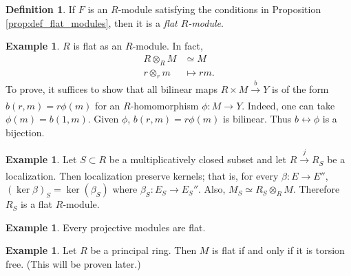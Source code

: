 \documentclass[12pt]{report}
\theoremstyle{plain}
\theoremstyle{remark}
\theoremstyle{definition}
\newtheorem{definition}[theorem]{Definition}
\newtheorem{example}[theorem]{Example}
\begin{document}
\begin{definition}
    If $F$ is an $R$-module satisfying the conditions in Proposition \ref{prop:def_flat_modules}, then it is a \emph{flat $R$-module}.
\end{definition}

\begin{example}
    $R$ is flat as an $R$-module. In fact, 
    \begin{align*}
        R\otimes_R M&\simeq M \\
        r\otimes_r m&\mapsto rm.
    \end{align*}
    To prove, it suffices to show that all bilinear maps $R\times M\xrightarrow[]{b}Y$ is of the form $b(r,m)=r\phi(m)$ for an $R$-homomorphism $\phi:M\to Y$. Indeed, one can take $\phi(m)=b(1,m)$. Given $\phi$, $b(r,m)=r\phi(m)$ is bilinear. Thus $b\leftrightarrow \phi$ is a bijection.
\end{example}

\begin{example}
    Let $S\subset R$ be a multiplicatively closed subset and let $R\xrightarrow[]{j}R_S$ be a localization. Then localization preserve kernels; that is, for every $\beta:E\to E''$, $(\ker \beta)_S=\ker (\beta_S)$ where $\beta_S:E_S\to E_S''$. Also, $M_S\simeq R_S\otimes_R M$. Therefore $R_S$ is a flat $R$-module.
\end{example}

\begin{example}
    Every projective modules are flat.
\end{example}

\begin{example}
    Let $R$ be a principal ring. Then $M$ is flat if and only if it is torsion free. (This will be proven later.)
\end{example}
\end{document}
